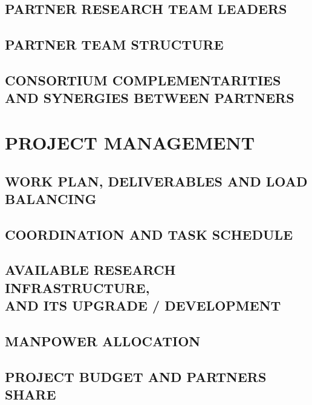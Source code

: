 \documentclass[11pt]{article}
\begin{document}
\subsection{PARTNER RESEARCH TEAM LEADERS} 


\subsection{PARTNER TEAM STRUCTURE} 


\subsection{CONSORTIUM COMPLEMENTARITIES AND SYNERGIES BETWEEN PARTNERS} 


\section{PROJECT MANAGEMENT} 

\subsection{WORK PLAN, DELIVERABLES AND LOAD BALANCING} 


\subsection{COORDINATION AND TASK SCHEDULE} 


\subsection{AVAILABLE RESEARCH INFRASTRUCTURE, \\ AND ITS UPGRADE / DEVELOPMENT} 


\subsection{MANPOWER ALLOCATION} 


\subsection{PROJECT BUDGET AND PARTNERS SHARE} 

\end{document}
